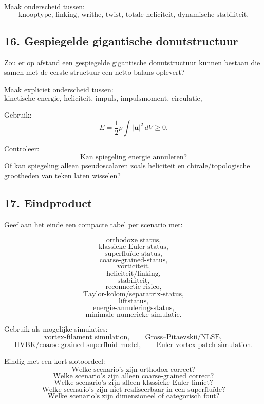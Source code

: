 \documentclass[11pt,a4paper]{article}
\begin{document}
Maak onderscheid tussen:
\[
\text{knooptype, linking, writhe, twist, totale heliciteit, dynamische stabiliteit.}
\]

\subsection{16. Gespiegelde gigantische donutstructuur}

Zou er op afstand een gespiegelde gigantische donutstructuur kunnen bestaan die samen met de eerste structuur een netto balans oplevert?

Maak expliciet onderscheid tussen:
\[
\text{kinetische energie, heliciteit, impuls, impulsmoment, circulatie, chirale/topologische lading.}
\]

Gebruik:
\[
E
=
\frac{1}{2}\rho\int |\mathbf{u}|^2\,dV
\geq0.
\]

Controleer:
\[
\text{Kan spiegeling energie annuleren?}
\]
Of kan spiegeling alleen pseudoscalaren zoals heliciteit en chirale/topologische grootheden van teken laten wisselen?

\subsection{17. Eindproduct}

Geef aan het einde een compacte tabel per scenario met:

\[
\text{orthodoxe status,}
\]
\[
\text{klassieke Euler-status,}
\]
\[
\text{superfluïde-status,}
\]
\[
\text{coarse-grained-status,}
\]
\[
\text{vorticiteit,}
\]
\[
\text{heliciteit/linking,}
\]
\[
\text{stabiliteit,}
\]
\[
\text{reconnectie-risico,}
\]
\[
\text{Taylor-kolom/separatrix-status,}
\]
\[
\text{liftstatus,}
\]
\[
\text{energie-annuleringsstatus,}
\]
\[
\text{minimale numerieke simulatie.}
\]

Gebruik als mogelijke simulaties:
\[
\text{vortex-filament simulation},
\qquad
\text{Gross--Pitaevskii/NLSE},
\]
\[
\text{HVBK/coarse-grained superfluid model},
\qquad
\text{Euler vortex-patch simulation}.
\]

Eindig met een kort slotoordeel:
\[
\text{Welke scenario's zijn orthodox correct?}
\]
\[
\text{Welke scenario's zijn alleen coarse-grained correct?}
\]
\[
\text{Welke scenario's zijn alleen klassieke Euler-limiet?}
\]
\[
\text{Welke scenario's zijn niet realiseerbaar in een superfluïde?}
\]
\[
\text{Welke scenario's zijn dimensioneel of categorisch fout?}
\]
\end{document}
